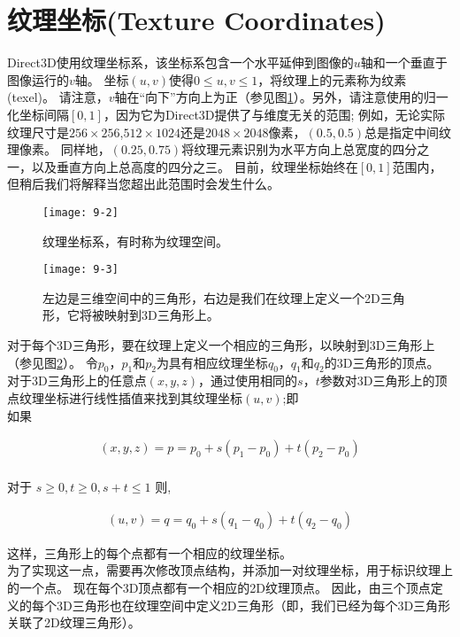 \section{纹理坐标(Texture Coordinates)}
\begin{flushleft}
Direct3D使用纹理坐标系，该坐标系包含一个水平延伸到图像的$u$轴和一个垂直于图像运行的$v$轴。 坐标$(u,v)$使得$0\leq u,v\leq 1$，将纹理上的元素称为纹素(texel)。 请注意，$v$轴在“向下”方向上为正（参见图\ref{fig:9-2}）。另外，请注意使用的归一化坐标间隔$[0,1]$，因为它为Direct3D提供了与维度无关的范围; 例如，无论实际纹理尺寸是$256\times 256$,$512\times 1024$还是$2048\times 2048$像素，$(0.5,0.5)$总是指定中间纹理像素。 同样地，$(0.25,0.75)$将纹理元素识别为水平方向上总宽度的四分之一，以及垂直方向上总高度的四分之三。 目前，纹理坐标始终在$[0,1]$范围内，但稍后我们将解释当您超出此范围时会发生什么。
\end{flushleft}

\begin{figure}[h]
    \label{fig:9-2}
    \texttt{[image: 9-2]}
    \centering
    \caption{纹理坐标系，有时称为纹理空间。}
\end{figure}

\begin{figure}[h]
    \label{fig:9-3}
    \texttt{[image: 9-3]}
    \centering
    \caption{左边是三维空间中的三角形，右边是我们在纹理上定义一个2D三角形，它将被映射到3D三角形上。}
\end{figure}

\begin{flushleft}
对于每个3D三角形，要在纹理上定义一个相应的三角形，以映射到3D三角形上（参见图\ref{fig:9-3}）。 令$p_{0}$，$p_{1}$和$p_{2}$为具有相应纹理坐标$q_{0}$，$q_{1}$和$q_{2}$的3D三角形的顶点。 对于3D三角形上的任意点$(x,y,z)$，通过使用相同的$s$，$t$参数对3D三角形上的顶点纹理坐标进行线性插值来找到其纹理坐标$(u,v)$;即\\
如果 \\
\end{flushleft}
\begin{align*}
(x,y,z)=p=p_{0}+s(p_{1}-p_{0})+t(p_{2}-p_{0})\\
\end{align*}
\begin{flushleft}
对于 $s\geq 0,t\geq 0,s+t\leq 1$ 则,\\
\end{flushleft}
\begin{align*}
(u,v)=q=q_{0}+s(q_{1}-q_{0})+t(q_{2}-q_{0})
\end{align*}
\begin{flushleft}
这样，三角形上的每个点都有一个相应的纹理坐标。\\
为了实现这一点，需要再次修改顶点结构，并添加一对纹理坐标，用于标识纹理上的一个点。 现在每个3D顶点都有一个相应的2D纹理顶点。 因此，由三个顶点定义的每个3D三角形也在纹理空间中定义2D三角形（即，我们已经为每个3D三角形关联了2D纹理三角形）。\\
\end{flushleft}

